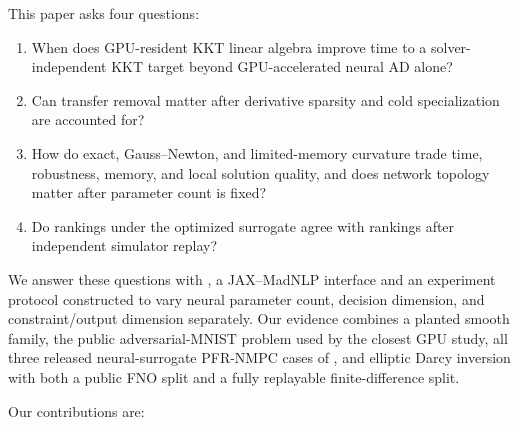 This paper asks four questions:

\begin{enumerate}
  \item When does GPU-resident KKT linear algebra improve time to a
  solver-independent KKT target beyond GPU-accelerated neural AD alone?
  \item Can transfer removal matter after derivative sparsity and cold
  specialization are accounted for?
  \item How do exact, Gauss--Newton, and limited-memory curvature trade time,
  robustness, memory, and local solution quality, and does network topology
  matter after parameter count is fixed?
  \item Do rankings under the optimized surrogate agree with rankings after
  independent simulator replay?
\end{enumerate}

We answer these questions with \method, a JAX--MadNLP interface and an
experiment protocol constructed to vary neural parameter count, decision
dimension, and constraint/output dimension separately.  Our evidence combines
a planted smooth family, the public adversarial-MNIST problem used by the
closest GPU study, all three released neural-surrogate PFR-NMPC cases of
\citet{elorza2025nmpc}, and elliptic Darcy inversion with both a public FNO
split and a fully replayable finite-difference split.

Our contributions are:


